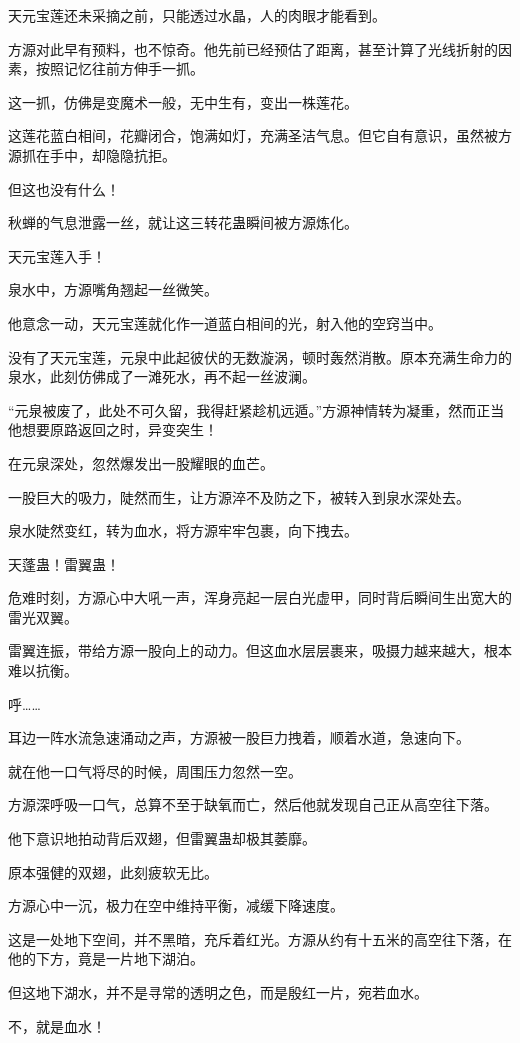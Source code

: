 \begin{this_body}
天元宝莲还未采摘之前，只能透过水晶，人的肉眼才能看到。

方源对此早有预料，也不惊奇。他先前已经预估了距离，甚至计算了光线折射的因素，按照记忆往前方伸手一抓。

这一抓，仿佛是变魔术一般，无中生有，变出一株莲花。

这莲花蓝白相间，花瓣闭合，饱满如灯，充满圣洁气息。但它自有意识，虽然被方源抓在手中，却隐隐抗拒。

但这也没有什么！

秋蝉的气息泄露一丝，就让这三转花蛊瞬间被方源炼化。

天元宝莲入手！

泉水中，方源嘴角翘起一丝微笑。

他意念一动，天元宝莲就化作一道蓝白相间的光，射入他的空窍当中。

没有了天元宝莲，元泉中此起彼伏的无数漩涡，顿时轰然消散。原本充满生命力的泉水，此刻仿佛成了一滩死水，再不起一丝波澜。

“元泉被废了，此处不可久留，我得赶紧趁机远遁。”方源神情转为凝重，然而正当他想要原路返回之时，异变突生！

在元泉深处，忽然爆发出一股耀眼的血芒。

一股巨大的吸力，陡然而生，让方源淬不及防之下，被转入到泉水深处去。

泉水陡然变红，转为血水，将方源牢牢包裹，向下拽去。

天蓬蛊！雷翼蛊！

危难时刻，方源心中大吼一声，浑身亮起一层白光虚甲，同时背后瞬间生出宽大的雷光双翼。

雷翼连振，带给方源一股向上的动力。但这血水层层裹来，吸摄力越来越大，根本难以抗衡。

呼……

耳边一阵水流急速涌动之声，方源被一股巨力拽着，顺着水道，急速向下。

就在他一口气将尽的时候，周围压力忽然一空。

方源深呼吸一口气，总算不至于缺氧而亡，然后他就发现自己正从高空往下落。

他下意识地拍动背后双翅，但雷翼蛊却极其萎靡。

原本强健的双翅，此刻疲软无比。

方源心中一沉，极力在空中维持平衡，减缓下降速度。

这是一处地下空间，并不黑暗，充斥着红光。方源从约有十五米的高空往下落，在他的下方，竟是一片地下湖泊。

但这地下湖水，并不是寻常的透明之色，而是殷红一片，宛若血水。

不，就是血水！


\end{this_body}
